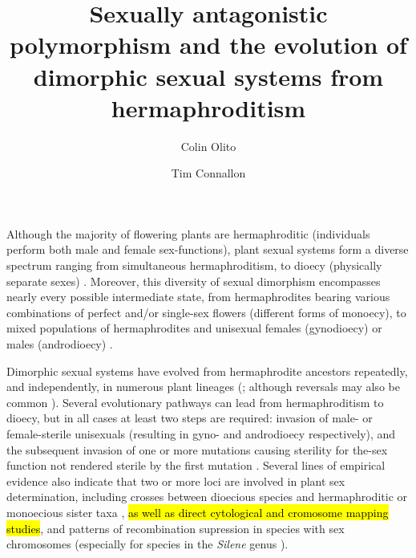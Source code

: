\documentclass[9pt,twocolumn,twoside,lineno]{gsajnl}
\title{Sexually antagonistic polymorphism and the evolution of dimorphic sexual systems from hermaphroditism}
\author[$\ast$,1]{Colin Olito}
\author[$\ast$]{Tim Connallon}
\affil[$\ast$]{Department of Biological Sciences, Monash University, Melbourne, VIC 3800, Australia}
\begin{document}
\maketitle
\thispagestyle{firststyle}
\marginmark
\firstpagefootnote
{}
\vspace{-11pt}%

\lettrine[lines=2]{\color{color2}A}{}lthough the majority of flowering plants are hermaphroditic (individuals perform both male and female sex-functions), plant sexual systems form a diverse spectrum ranging from simultaneous hermaphroditism, to dioecy (physically separate sexes) \citep{Darwin1877,Westergaard1958,Bachtrog2014}. Moreover, this diversity of sexual dimorphism encompasses nearly every possible intermediate state, from hermaphrodites bearing various combinations of perfect and/or single-sex flowers (different forms of monoecy), to mixed populations of hermaphrodites and unisexual females (gynodioecy) or males (androdioecy) \citep{Bawa1980,SakaiWeller1999}.

Dimorphic sexual systems have evolved from hermaphrodite ancestors repeatedly, and independently, in numerous plant lineages (\citealt{Westergaard1958,SakaiWeller1999,Charlesworth2006,Bachtrog2014,Renner2014}; although reversals may also be common \citealt{GoldbergOtto2017,KaferPannell2017}). Several evolutionary pathways can lead from hermaphroditism to dioecy, but in all cases at least two steps are required: invasion of male- or female-sterile unisexuals (resulting in gyno- and androdioecy respectively), and the subsequent invasion of one or more mutations causing sterility for the-sex function not rendered sterile by the first mutation \citep{Westergaard1958,Charlesworth1978a,Charlesworth1978b,Charlesworth2006,Charlesworth2009,KaferPannell2017}. Several lines of empirical evidence also indicate that two or more loci are involved in plant sex determination, including crosses between dioecious species and hermaphroditic or monoecious sister taxa \citep{Westergaard1958}, \hl{as well as direct cytological and cromosome mapping studies}, and patterns of recombination supression in species with sex chromosomes (especially for species in the \textit{Silene} genus \citealt{Charlesworth2002,Charlesworth2006}). 
\end{document}

